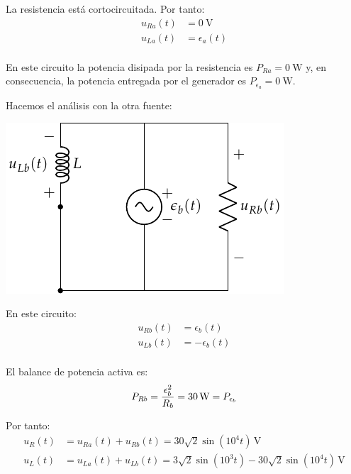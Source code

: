 La resistencia está cortocircuitada. Por tanto:
\begin{align*}
  u_{Ra}(t) &= \qty{0}{\volt}\\
  u_{La}(t) &= \epsilon_a(t)\\  
\end{align*}

\vspace{-2mm}
En este circuito la potencia disipada por la resistencia es $P_{Ra} = \qty{0}{\watt}$ y, en consecuencia, la potencia entregada por el generador es $P_{\epsilon_a} = \qty{0}{\watt}$.

\vspace{4mm}
Hacemos el análisis con la otra fuente:

\begin{center}
\includegraphics{figuras/superposicion2_B}
\end{center}

En este circuito:
\begin{align*}
  u_{Rb}(t) &= \epsilon_b(t)\\
  u_{Lb}(t) &= -\epsilon_b(t)\\  
\end{align*}

\vspace{-2mm}
El balance de potencia activa es:
\begin{equation*}
  P_{Rb} = \frac{\epsilon_b^2}{R_b} = \qty{30}{\watt} = P_{\epsilon_b}\\
\end{equation*}

Por tanto:
\begin{align*}
  u_R(t) &= u_{Ra}(t) + u_{Rb}(t) = 30\sqrt{2}\sin(10^4 t)\,\si{\volt}\\
  u_L(t) &= u_{La}(t) + u_{Lb}(t) = 3\sqrt{2}\sin(10^3 t) - 30\sqrt{2}\sin(10^4 t)\,\si{\volt}\\
\end{align*}

